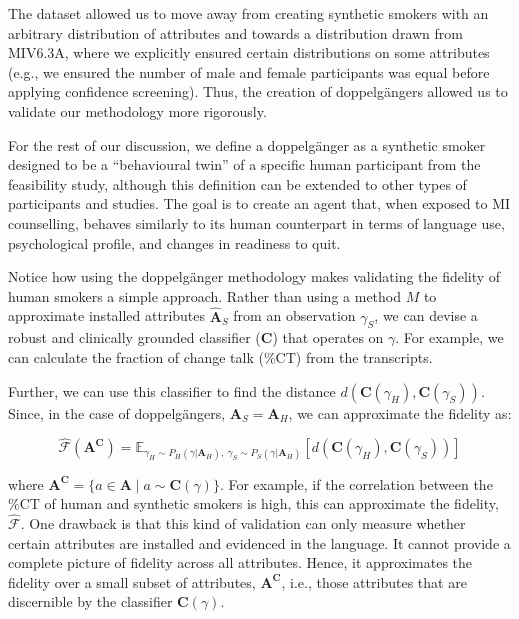 The dataset allowed us to move away from creating synthetic smokers with an arbitrary distribution of attributes and towards a distribution drawn from MIV6.3A, where we explicitly ensured certain distributions on some attributes (e.g., we ensured the number of male and female participants was equal before applying confidence screening). Thus, the creation of doppelgängers allowed us to validate our methodology more rigorously.

For the rest of our discussion, we define a doppelgänger as a synthetic smoker designed to be a ``behavioural twin'' of a specific human participant from the feasibility study, although this definition can be extended to other types of participants and studies. The goal is to create an agent that, when exposed to MI counselling, behaves similarly to its human counterpart in terms of language use, psychological profile, and changes in readiness to quit.

Notice how using the doppelgänger methodology makes validating the fidelity of human smokers a simple approach. Rather than using a method $M$ to approximate installed attributes $\hat{\textbf{A}}_S$ from an observation $\gamma_S$, we can devise a robust and clinically grounded classifier ($\textbf{C}$) that operates on $\gamma$. For example, we can calculate the fraction of change talk (\%CT) from the transcripts.

Further, we can use this classifier to find the distance $d(\textbf{C}(\gamma_H), \textbf{C}(\gamma_S))$. Since, in the case of doppelgängers, $\textbf{A}_S = \textbf{A}_H$, we can approximate the fidelity as:

$$\hat{\mathcal{F}}(\textbf{A}^\textbf{C}) = \mathbb{E}_{\gamma_H \sim P_H (\gamma | \textbf{A}_H),  \:  \gamma_S \sim P_S(\gamma | \textbf{A}_H)}[d(
\textbf{C}(\gamma_H),\textbf{C}(\gamma_S)
)]$$


where $\textbf{A}^\textbf{C} = \{a \in \textbf{A} \mid a \sim \textbf{C}(\gamma)\}$. For example, if the correlation between the \%CT of human and synthetic smokers is high, this can approximate the fidelity, $\hat{\mathcal{F}}$. One drawback is that this kind of validation can only measure whether certain attributes are installed and evidenced in the language. It cannot provide a complete picture of fidelity across all attributes. Hence, it approximates the fidelity over a small subset of attributes, $\textbf{A}^\textbf{C}$, i.e., those attributes that are discernible by the classifier $\textbf{C}(\gamma)$.



